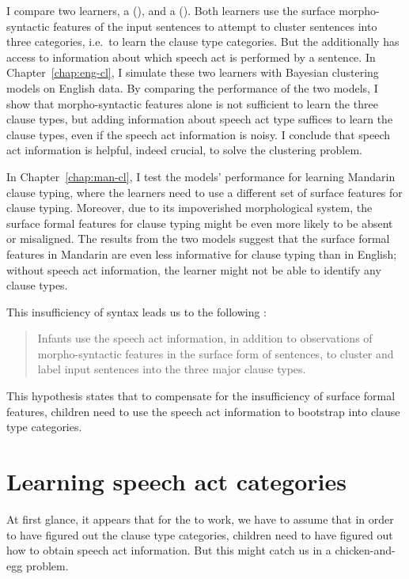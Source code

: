 I compare two learners, a \distlearner{} (\dlearnerabbr{}), and a \praglearner{} (\plearnerabbr{}). Both learners use the surface morpho-syntactic features of the input sentences to attempt to cluster sentences into three categories, i.e.\ to learn the clause type categories. But the \plearnerabbr{} additionally has access to information about which speech act is performed by a sentence. In Chapter~\ref{chap:eng-cl}, I simulate these two learners with Bayesian clustering models on English data. By comparing the performance of the two models, I show that morpho-syntactic features alone is not sufficient to learn the three clause types, but adding information about speech act type suffices to learn the clause types, even if the speech act information is noisy. I conclude that speech act information is helpful, indeed crucial, to solve the clustering problem.

In Chapter~\ref{chap:man-cl}, I test the models' performance for learning Mandarin clause typing, where the learners need to use a different set of surface features for clause typing. Moreover, due to its impoverished morphological system, the surface formal features for clause typing might be even more likely to be absent or misaligned. The results from the two models suggest that the surface formal features in Mandarin are even less informative for clause typing than in English; without speech act information, the learner might not be able to identify any clause types.  

This insufficiency of syntax leads us to the following \tbf{\subhypos{}}:
\begin{quote}
Infants use the speech act information, in addition to observations of morpho-syntactic features in the surface form of sentences, to cluster and label input sentences into the three major clause types.
\end{quote}


This hypothesis states that to compensate for the insufficiency of surface formal features, children need to use the speech act information to bootstrap into clause type categories.



\section{Learning speech act categories}
\label{sec:intro:sp}

At first glance, it appears that for the \subhypos{} to work, we have to assume that in order to have figured out the clause type categories, children need to have figured out how to obtain speech act information. But this might catch us in a chicken-and-egg problem.

